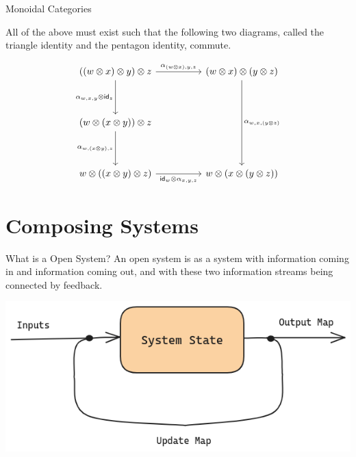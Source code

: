 \documentclass{beamer}
\begin{document}
\begin{frame}[fragile]{Monoidal Categories}
    \begin{definition}
        All of the above must exist such that the following two diagrams, called the triangle identity and the pentagon identity, commute.

        \vspace*{0.125in}
        \[\begin{tikzcd}
                {((w\otimes x)\otimes y)\otimes z} && {(w\otimes x)\otimes(y\otimes z)} \\
                \\
                {(w\otimes (x\otimes y))\otimes z} \\
                \\
                {w\otimes ((x\otimes y)\otimes z)} && {w\otimes (x\otimes (y\otimes z))}
                \arrow["{{\alpha_{w,x,(y\otimes z)}}}", from=1-3, to=5-3]
                \arrow["{{\alpha_{(w\otimes x),y,z}}}", from=1-1, to=1-3]
                \arrow["{{\alpha_{w,x,y}\otimes \mathsf{id}_z}}"', from=1-1, to=3-1]
                \arrow["{{\alpha_{w,(x\otimes y),z}}}"', from=3-1, to=5-1]
                \arrow["{{\mathsf{id}_w\otimes \alpha_{x,y,z}}}"', from=5-1, to=5-3]
            \end{tikzcd}\]
    \end{definition}
\end{frame}

\section{Composing Systems}
\begin{frame}{What is a Open System?}
    An open system is as a system with information coming in and information coming out, and with these two information streams being connected by feedback.
    \vspace*{0.125in}
    \begin{center}
        \includegraphics[scale=0.35]{system_diagram_open.png}
    \end{center}
\end{frame}
\end{document}
